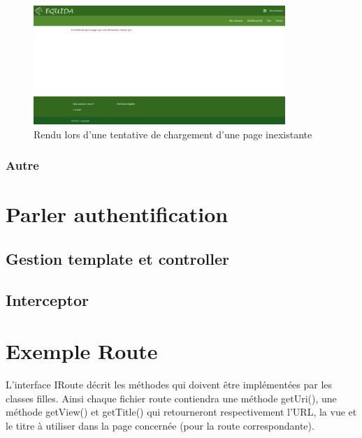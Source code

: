 				\begin{figure}[H]
					\centering\includegraphics[width=0.85\textwidth, keepaspectratio]{res/exempleErreur404.png}
					\caption{Rendu lors d'une tentative de chargement d'une page inexistante}
				\end{figure}

			\subsubsection{Autre}


	\section{Parler authentification}

		\subsection{Gestion template et controller}


		\subsection{Interceptor}
			\label{subsec:interceptor}


	\section{Exemple Route}

		L'interface IRoute décrit les méthodes qui doivent être implémentées par les classes filles.\newline
		Ainsi chaque fichier route contiendra une méthode getUri(), une méthode getView() et getTitle() qui retourneront respectivement l'URL, la vue et le titre à utiliser dans la page concernée (pour la route correspondante).

